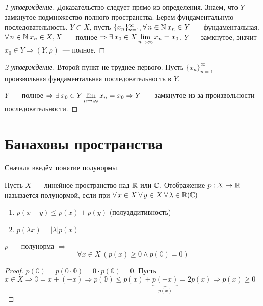 \documentclass[document]{subfiles}
\begin{document}
\begin{proof}[1 утверждение]
        Доказательство следует прямо из определения. Знаем, что $Y$~--- замкнутое подмножество полного пространства.
        Берем фундаментальную последовательность. $Y \subset X$, пусть $\{x_n\}^\infty_{n=1}, \forall n \in \bN \: x_n \in Y$~--- фундаментальная.
        $\forall n \in \bN \: x_n \in X, X$~--- полное $\Rightarrow \exists x_0 \in X \liml_{n \to \infty} x_n = x_0$. $Y$~--- замкнутое, значит $x_0 \in Y \Rightarrow (Y, \rho)$~--- полное.
\end{proof}
\begin{proof}[2 утверждение]
        Второй пункт не труднее первого. Пусть $\{x_n\}^\infty_{n=1}$~--- произвольная фундаментальная последовательность в $Y$.

        $Y$~--- полное $\Rightarrow \exists x_0 \in Y \liml_{n \to \infty} x_n = x_0 \Rightarrow Y$~--- замкнутое из-за произвольности последовательности.
\end{proof}

\section{Банаховы пространства}

Сначала введём понятие полунормы.
\begin{definition}[полунорма]
    Пусть $X$~--- линейное пространство над $\mathbb{R}$ или $\mathbb{C}$. Отображение $p: X \rightarrow \mathbb{R}$ называется полунормой, если при $\forall x \in X \: \forall y \in X \: \forall \lambda \in \bR (\bC)$
    \begin{enumerate}
        \item $p(x + y) \leq p(x) + p(y)$ (полуаддитивность)
        \item $p(\lambda x) = |\lambda| p(x)$
    \end{enumerate} 
\end{definition}

\begin{property}
    $p$~--- полунорма $\Rightarrow$
    \[ \forall x \in X \: (p(x) \geq 0 \land p(\mathbb{0}) = 0) \]
\end{property}

\begin{proof}
    $p(\mathbb{0}) = p(0 \cdot \mathbb{0}) = 0 \cdot p(\mathbb{0}) = 0$.
    Пусть $x \in X \Rightarrow \mathbb{0} = x + (-x) \Rightarrow p(\mathbb{0}) \leq p(x) + \underbrace{p(-x)}_{p(x)} = 2p(x) \Rightarrow p(x) \geq 0$
\end{proof}
\end{document}
